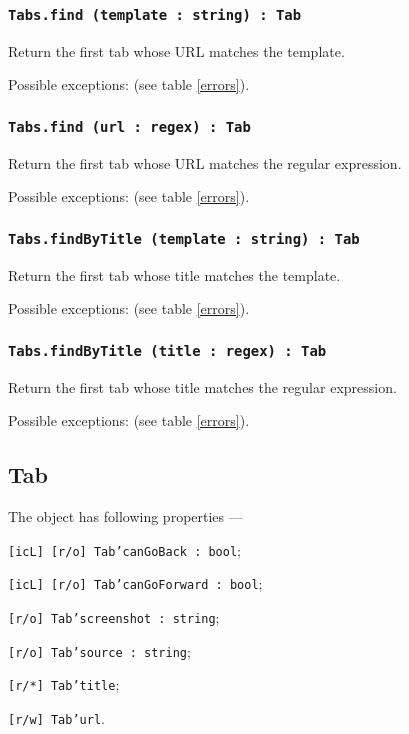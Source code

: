 \subsubsection{\texttt{Tabs.find (template : string) : Tab}}

Return the first tab whose URL matches the template.

Possible exceptions:  (see table \ref{errors}).

\subsubsection{\texttt{Tabs.find (url : regex) : Tab}}

Return the first tab whose URL matches the regular expression.

Possible exceptions:  (see table \ref{errors}).

\subsubsection{\texttt{Tabs.findByTitle (template : string) : Tab}}

Return the first tab whose title matches the template.

Possible exceptions:  (see table \ref{errors}).

\subsubsection{\texttt{Tabs.findByTitle (title : regex) : Tab}}

Return the first tab whose title matches the regular expression.

Possible exceptions:  (see table \ref{errors}).

\subsection{Tab}

The object \tab{} has following properties —
\begin{icItems}
	\item \texttt{[icL] [r/o] Tab'canGoBack : bool};
	\item \texttt{[icL] [r/o] Tab'canGoForward : bool};
	\item \texttt{[r/o] Tab'screenshot : string};
	\item \texttt{[r/o] Tab'source : string};
	\item \texttt{[r/*] Tab'title};
	\item \texttt{[r/w] Tab'url}.
\end{icItems}

